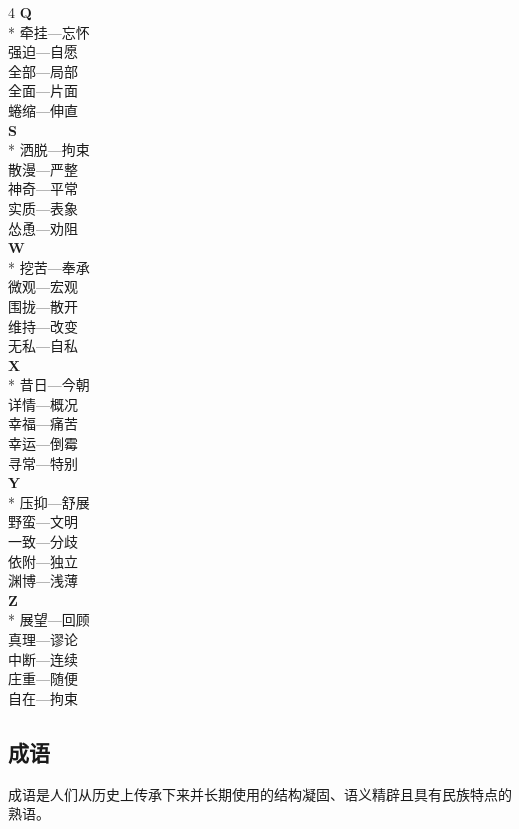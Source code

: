 \documentclass[final,oneside]{ctexbook}
\begin{document}
\begin{multicols}{4}
  \textbf{Q}\\*
  牵挂---忘怀\\
  强迫---自愿\\
  全部---局部\\
  全面---片面\\
  蜷缩---伸直\\

  \textbf{S}\\*
  洒脱---拘束\\
  散漫---严整\\
  神奇---平常\\
  实质---表象\\
  怂恿---劝阻\\

  \textbf{W}\\*
  挖苦---奉承\\
  微观---宏观\\
  围拢---散开\\
  维持---改变\\
  无私---自私\\

  \textbf{X}\\*
  昔日---今朝\\
  详情---概况\\
  幸福---痛苦\\
  幸运---倒霉\\
  寻常---特别\\

  \textbf{Y}\\*
  压抑---舒展\\
  野蛮---文明\\
  一致---分歧\\
  依附---独立\\
  渊博---浅薄\\

  \textbf{Z}\\*
  展望---回顾\\
  真理---谬论\\
  中断---连续\\
  庄重---随便\\
  自在---拘束\\

\end{multicols}

\subsection{成语}

成语是人们从历史上传承下来并长期使用的结构凝固、语义精辟且具有民族特点的熟语。
\end{document}
